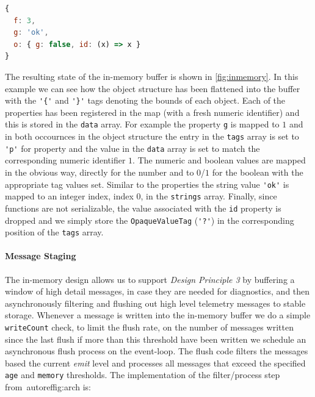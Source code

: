 \begin{lstlisting}[language=JavaScript,basicstyle=\scriptsize,numbers=none]
{
  f: 3,
  g: 'ok',
  o: { g: false, id: (x) => x }
}
\end{lstlisting}

The resulting state of the in-memory buffer is shown in \autoref{fig:inmemory}. 
In this example we can see how the object structure has been flattened into 
the buffer with the \lstinline!'{'! and \lstinline!'}'! tags denoting the bounds 
of each object. Each of the properties has been registered in the map (with a fresh 
numeric identifier) and this is stored in the \texttt{data} array. For example the 
property \lstinline!g! is mapped to $1$ and in both occournces in the object 
structure the entry in the \texttt{tags} array is set to \lstinline!'p'! for 
property and the value in the \texttt{data} array is set to match the corresponding 
numeric identifier $1$. The numeric and boolean values are mapped in the obvious 
way, directly for the number and to $0$/$1$ for the boolean with the appropriate 
tag values set. Similar to the properties the string value \lstinline!'ok'! is 
mapped to an integer index, index $0$, in the \texttt{strings} array. Finally, 
since functions are not serializable, the value associated with the \lstinline!id! 
property is dropped and we simply store the \texttt{OpaqueValueTag} (\lstinline!'?'!) 
in the corresponding position of the \texttt{tags} array.

\paragraph{Message Staging}
\noindent
The in-memory design allows us to support \emph{Design Principle 3} by buffering a 
window of high detail messages, in case they are needed for diagnostics, and then 
asynchronously filtering and flushing out high level telemetry messages to stable 
storage. Whenever a message is written into the in-memory buffer we do a simple 
\texttt{writeCount} check, to limit the flush rate, on the number of messages written 
since the last flush if more than this threshold have been written we schedule an 
asynchronous flush process on the event-loop. The flush code filters the messages 
based the current \emph{emit} level and processes all messages that exceed the 
specified \texttt{age} and \texttt{memory} thresholds. The implementation of the 
filter/process step from~autoref{fig:arch} is:



